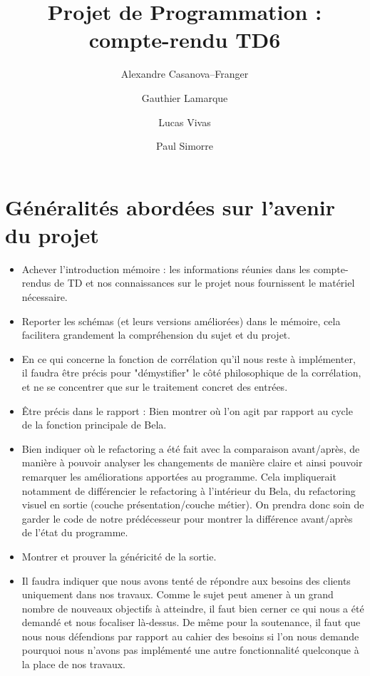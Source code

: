 \documentclass[a4paper]{article}
\title{Projet de Programmation : compte-rendu TD6}
\author{Alexandre Casanova--Franger\and Gauthier Lamarque\and Lucas Vivas\and Paul Simorre}
\begin{document}
\maketitle

\section{Généralités abordées sur l'avenir du projet}

\begin{itemize}

\item Achever l'introduction mémoire : les informations réunies dans les compte-rendus de TD et nos connaissances sur le projet nous fournissent le matériel nécessaire.
\item Reporter les schémas (et leurs versions améliorées) dans le mémoire, cela facilitera grandement la compréhension du sujet et du projet.
\item En ce qui concerne la fonction de corrélation qu'il nous reste à implémenter, il faudra être précis pour "démystifier" le côté philosophique de la corrélation, et ne se concentrer que sur le traitement concret des entrées.

\item Être précis dans le rapport : Bien montrer où l'on agit par rapport au cycle de la fonction principale de Bela.

\item Bien indiquer où le refactoring a été fait avec la comparaison avant/après, de manière à pouvoir analyser les changements de manière claire et ainsi pouvoir remarquer les améliorations apportées au programme. Cela impliquerait notamment de différencier le refactoring à l'intérieur du Bela, du refactoring visuel en sortie (couche présentation/couche métier). On prendra donc soin de garder le code de notre prédécesseur pour montrer la différence avant/après de l'état du programme.

\item Montrer et prouver la généricité de la sortie.

\item Il faudra indiquer que nous avons tenté de répondre aux besoins des clients uniquement dans nos travaux. Comme le sujet peut amener à un grand nombre de nouveaux objectifs à atteindre, il faut bien cerner ce qui nous a été demandé et nous focaliser là-dessus. De même pour la soutenance, il faut que nous nous défendions par rapport au cahier des besoins si l'on nous demande pourquoi nous n'avons pas implémenté une autre fonctionnalité quelconque à la place de nos travaux.


\end{itemize}
\end{document}
